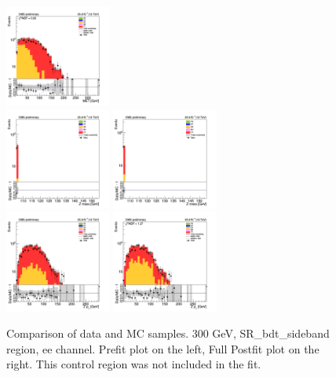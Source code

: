 \begin{figure}[tbp]
\begin{center}
    \includegraphics[width=0.31\textwidth]{figures/ee_300_april18/ee_300_good_SR_bdt_sideBand_april18/met_pt_ee_SR_FullPostfit_plot_apr18.png}\\
    \includegraphics[width=0.31\textwidth]{figures/ee_300_april18/ee_300_good_SR_bdt_sideBand_april18/zmass_high_ee_SR_prefit_plot_apr18.png}
    \includegraphics[width=0.31\textwidth]{figures/ee_300_april18/ee_300_good_SR_bdt_sideBand_april18/zmass_high_ee_SR_FullPostfit_plot_apr18.png}\\
    \includegraphics[width=0.31\textwidth]{figures/ee_300_april18/ee_300_good_SR_bdt_sideBand_april18/zpt0_ee_SR_prefit_plot_apr18.png}
    \includegraphics[width=0.31\textwidth]{figures/ee_300_april18/ee_300_good_SR_bdt_sideBand_april18/zpt0_ee_SR_FullPostfit_plot_apr18.png}\\
    \caption{Comparison of data and MC samples. 300 GeV, SR\_bdt\_sideband region, ee channel. Prefit plot on the left,           Full Postfit plot on the right. This control region was not included in the fit.}
    \label{fig:MCcomparisons_ee_low_SR_bdt_sideband_2}
  \end{center}
\end{figure}
